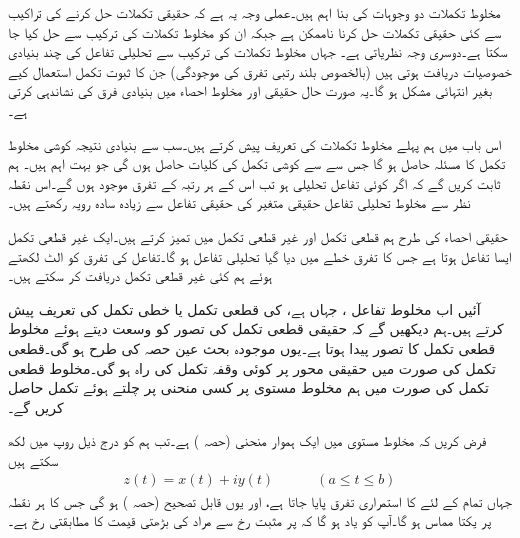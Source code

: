 مخلوط تکملات دو وجوہات کی بنا اہم ہیں۔عملی وجہ یہ ہے کہ حقیقی تکملات حل کرنے کی تراکیب سے کئی حقیقی تکملات حل کرنا ناممکن ہے جبکہ ان کو مخلوط تکملات کی ترکیب سے حل کیا جا سکتا ہے۔دوسری وجہ نظریاتی ہے۔ جہاں مخلوط تکملات کی ترکیب سے تحلیلی تفاعل کی چند بنیادی خصوصیات دریافت ہوتی ہیں (بالخصوص بلند رتبی تفرق کی موجودگی) جن کا ثبوت  تکمل استعمال کیے بغیر انتہائی مشکل ہو گا۔یہ صورت حال حقیقی اور مخلوط احصاء میں بنیادی فرق کی نشاندہی کرتی ہے۔

اس باب میں ہم پہلے مخلوط تکملات کی تعریف پیش کرتے ہیں۔سب سے بنیادی نتیجہ  کوشی مخلوط تکمل کا مسئلہ حاصل ہو گا جس سے  سے کوشی تکمل کی کلیات حاصل ہوں گی جو بہت اہم  ہیں۔ ہم ثابت کریں گے کہ اگر کوئی تفاعل تحلیلی ہو تب اس کے ہر رتبہ کے تفرق موجود ہوں گے۔اس نقطہ نظر سے مخلوط تحلیلی تفاعل حقیقی متغیر کی حقیقی تفاعل سے زیادہ سادہ رویہ رکھتے ہیں۔

حقیقی احصاء کی طرح ہم قطعی تکمل اور غیر قطعی تکمل میں تمیز کرتے ہیں۔ایک غیر قطعی تکمل ایسا تفاعل ہوتا ہے جس کا تفرق خطے میں دیا گیا تحلیلی تفاعل ہو گا۔تفاعل کی تفرق کو الٹ لکھتے ہوئے ہم کئی غیر قطعی تکمل دریافت کر سکتے ہیں۔

آئیں اب مخلوط تفاعل ، جہاں  ہے، کی قطعی تکمل یا خطی تکمل کی تعریف پیش کرتے ہیں۔ہم دیکھیں گے کہ حقیقی قطعی تکمل کی تصور کو وسعت دیتے ہوئے  مخلوط قطعی تکمل کا تصور پیدا ہوتا ہے۔یوں موجودہ بحث عین حصہ  کی طرح ہو گی۔قطعی تکمل کی صورت میں حقیقی محور پر کوئی وقفہ تکمل کی راہ  ہو گی۔مخلوط قطعی تکمل کی صورت میں ہم مخلوط مستوی پر کسی منحنی پر چلتے ہوئے تکمل حاصل کریں گے۔

فرض کریں کہ  مخلوط  مستوی میں  ایک ہموار منحنی (حصہ ) ہے۔تب ہم  کو درج ذیل روپ میں لکھ سکتے ہیں
\begin{align}\label{مساوات_مخلوط_تکمل_راہ_الف}
z(t)=x(t)+iy(t)\quad \quad \quad (a\le t\le b)
\end{align}
جہاں تمام  کے لئے  کا استمراری تفرق  پایا جاتا ہے، اور یوں  قابل تصحیح (حصہ ) ہو گی جس کا ہر نقطہ پر یکتا مماس ہو گا۔آپ کو یاد ہو گا کہ  پر مثبت رخ سے مراد   کی بڑھتی قیمت کا مطابقتی رخ  ہے۔

